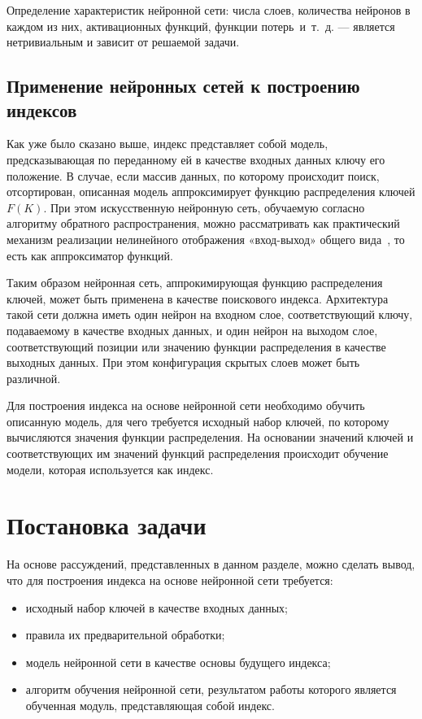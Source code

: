 Определение характеристик нейронной сети: числа слоев, количества нейронов в
каждом из них, активационных функций, функции потерь~и~т.~д. --- является
нетривиальным и зависит от решаемой задачи.

\subsection{Применение нейронных сетей к построению индексов}

Как уже было сказано выше, индекс представляет собой модель, предсказывающая по
переданному ей в качестве входных данных ключу его положение. В случае, если
массив данных, по которому происходит поиск, отсортирован, описанная модель
аппроксимирует функцию распределения ключей $F(K)$. При этом искусственную
нейронную сеть, обучаемую согласно алгоритму обратного распространения, можно
рассматривать как практический механизм реализации нелинейного отображения
«вход-выход» общего вида~\cite{kalistratov}, то есть как аппроксиматор функций.

Таким образом нейронная сеть, аппрокимирующая функцию распределения ключей,
может быть применена в качестве поискового индекса. Архитектура такой сети
должна иметь один нейрон на входном слое, соответствующий ключу, подаваемому в
качестве входных данных, и один нейрон на выходом слое, соответствующий позиции
или значению функции распределения в качестве выходных данных. При этом
конфигурация скрытых слоев может быть различной.


Для построения индекса на основе нейронной сети необходимо обучить описанную
модель, для чего требуется исходный набор ключей, по которому вычисляются
значения функции распределения. На основании значений ключей и соответствующих
им значений функций распределения происходит обучение модели, которая
используется как индекс.

\section{Постановка задачи}

На основе рассуждений, представленных в данном разделе, можно сделать вывод, что
для построения индекса на основе нейронной сети требуется:

\begin{itemize}
    \item исходный набор ключей в качестве входных данных;
    \item правила их предварительной обработки;
    \item модель нейронной сети в качестве основы будущего индекса;
    \item алгоритм обучения нейронной сети, результатом работы которого является
        обученная модуль, представляющая собой индекс.
\end{itemize}

